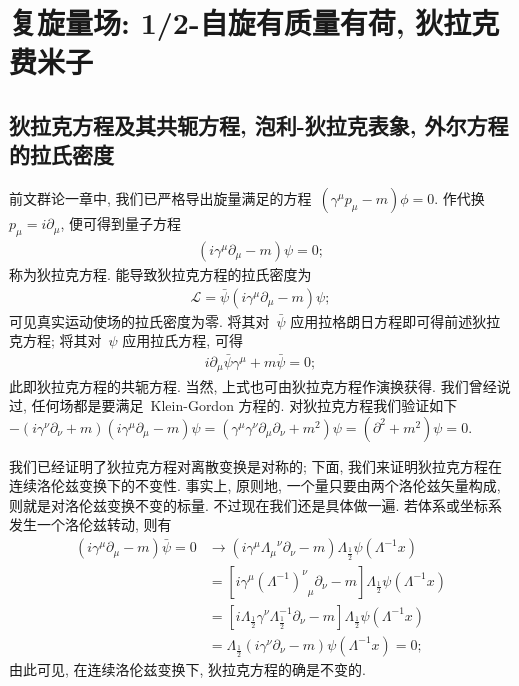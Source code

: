 \section{复旋量场: 1/2-自旋有质量有荷, 狄拉克费米子}
\subsection{狄拉克方程及其共轭方程, 泡利-狄拉克表象, 外尔方程的拉氏密度}
前文群论一章中, 我们已严格导出旋量满足的方程~$(\gamma^\mu p_\mu-m)\phi=0$. 作代换~$p_\mu=i\partial_\mu$, 便可得到量子方程
\begin{align}
(i\gamma^\mu\partial_\mu-m)\psi=0;
\end{align}
称为狄拉克方程. 能导致狄拉克方程的拉氏密度为
\begin{align}
\mathcal{L}=\bar{\psi}(i\gamma^\mu\partial_\mu-m)\psi;
\end{align}
可见真实运动使场的拉氏密度为零. 将其对~$\bar{\psi}$ 应用拉格朗日方程即可得前述狄拉克方程; 将其对~$\psi$ 应用拉氏方程, 可得
\begin{align}
i\partial_\mu\bar{\psi}\gamma^\mu+m\bar{\psi}=0;
\end{align}
此即狄拉克方程的共轭方程. 当然, 上式也可由狄拉克方程作演换获得. 我们曾经说过, 任何场都是要满足~Klein-Gordon 方程的. 对狄拉克方程我们验证如下~$-(i\gamma^\nu\partial_\nu+m)(i\gamma^\mu\partial_\mu-m)\psi=(\gamma^\mu\gamma^\nu\partial_\mu\partial_\nu+m^2)\psi=(\partial^2+m^2)\psi=0$.

我们已经证明了狄拉克方程对离散变换是对称的; 下面, 我们来证明狄拉克方程在连续洛伦兹变换下的不变性. 事实上, 原则地, 一个量只要由两个洛伦兹矢量构成, 则就是对洛伦兹变换不变的标量. 不过现在我们还是具体做一遍. 若体系或坐标系发生一个洛伦兹转动, 则有
\begin{align}
(i\gamma^\mu\partial_\mu-m)\bar{\psi}=0&\rightarrow\left(i\gamma^\mu{\Lambda_\mu}^\nu\partial_\nu-m\right)\Lambda_{\frac{1}{2}}\psi(\Lambda^{-1}x)\nonumber\\
&=\left[i\gamma^\mu{(\Lambda^{-1})^\nu}_\mu\partial_\nu-m\right]\Lambda_{\frac{1}{2}}\psi(\Lambda^{-1}x)\nonumber\\
&=\left[i\Lambda_{\frac{1}{2}}\gamma^\nu\Lambda^{-1}_{\frac{1}{2}}\partial_\nu-m\right]\Lambda_{\frac{1}{2}}\psi(\Lambda^{-1}x)\nonumber\\
&=\Lambda_{\frac{1}{2}}(i\gamma^\nu\partial_\nu-m)\psi(\Lambda^{-1}x)=0;
\end{align}
由此可见, 在连续洛伦兹变换下, 狄拉克方程的确是不变的.

